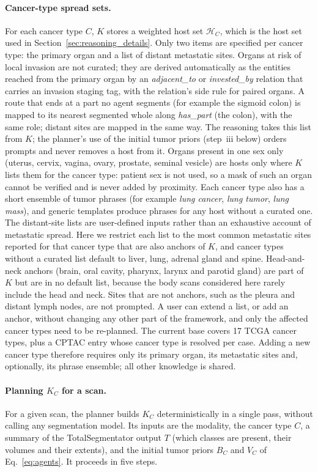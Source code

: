 \documentclass[fleqn,10pt]{olplainarticle}
\begin{document}
\paragraph{Cancer-type spread sets.}
For each cancer type $C$, $K$ stores a weighted host set $\mathcal{H}_C$, which is the host set used in
Section~\ref{sec:reasoning_details}. Only two items are specified per cancer type: the primary organ and a list of
distant metastatic sites. Organs at risk of local invasion are not curated; they are
derived automatically as the entities reached from the primary organ by an \emph{adjacent\_to} or \emph{invested\_by}
relation that carries an invasion staging tag, with the relation's side rule for paired organs. A route that ends at a part
no agent segments (for example the sigmoid colon) is mapped to its nearest segmented whole along \emph{has\_part} (the
colon), with the same role; distant sites are mapped in the same way. The reasoning takes this list from $K$; the
planner's use of the initial tumor priors (step~iii below) orders prompts and never removes a host from it. Organs present
in one sex only (uterus, cervix, vagina, ovary, prostate, seminal vesicle) are hosts only where $K$ lists them for the
cancer type: patient sex is not used, so a mask of such an organ cannot be verified and is never added by proximity. Each cancer type also has a short ensemble of tumor phrases (for example \emph{lung cancer}, \emph{lung
tumor}, \emph{lung mass}), and generic templates produce phrases for any host without a curated one. The distant-site lists are user-defined inputs rather than an exhaustive account of metastatic spread. Here we
restrict each list to the most common metastatic sites reported for that cancer type that are also anchors of $K$, and
cancer types without a curated list default to liver, lung, adrenal gland and spine. Head-and-neck anchors (brain, oral cavity,
pharynx, larynx and parotid gland) are part of $K$ but are in no default list, because the body scans considered here
rarely include the head and neck. Sites that are not anchors, such
as the pleura and distant lymph nodes, are not prompted. A user can extend a list, or add an anchor, without changing any other part of the framework, and only the affected cancer types need to be re-planned. The current
base covers 17 TCGA cancer types, plus a CPTAC entry whose cancer type is resolved per case. Adding a new cancer type
therefore requires only its primary organ, its metastatic sites and, optionally, its phrase ensemble; all other
knowledge is shared.

\paragraph{Planning $K_C$ for a scan.}
For a given scan, the planner builds $K_C$ deterministically in a single pass, without calling any segmentation model.
Its inputs are the modality, the cancer type $C$, a summary of the TotalSegmentator output $T$ (which classes are
present, their volumes and their extents), and the initial tumor priors $B_C$ and $V_C$ of Eq.~\eqref{eq:agents}.
It proceeds in five steps.
\end{document}
